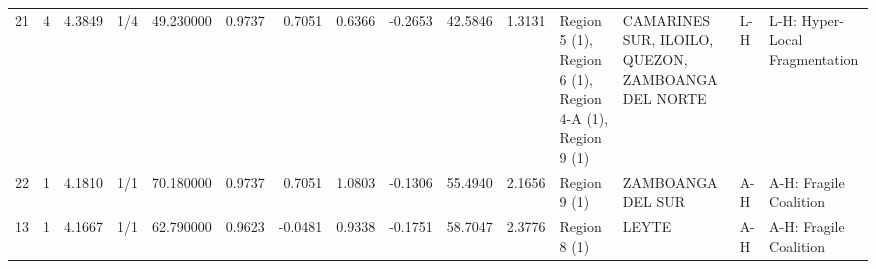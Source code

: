 \begin{tabular}{rrrlrrrrrrrllll}
21 & 4 & {\cellcolor[HTML]{5E7DE7}} \color[HTML]{F1F1F1} 4.3849 & 1/4 & {\cellcolor[HTML]{6B8DF0}} \color[HTML]{F1F1F1} 49.230000 & 0.9737 & 0.7051 & 0.6366 & -0.2653 & 42.5846 & 1.3131 & Region 5 (1), Region 6 (1), Region 4-A (1), Region 9 (1) & CAMARINES SUR, ILOILO, QUEZON, ZAMBOANGA DEL NORTE & L-H & L-H: Hyper-Local Fragmentation \\
22 & 1 & {\cellcolor[HTML]{3C4EC2}} \color[HTML]{F1F1F1} 4.1810 & 1/1 & {\cellcolor[HTML]{B8122A}} \color[HTML]{F1F1F1} 70.180000 & 0.9737 & 0.7051 & 1.0803 & -0.1306 & 55.4940 & 2.1656 & Region 9 (1) & ZAMBOANGA DEL SUR & A-H & A-H: Fragile Coalition \\
13 & 1 & {\cellcolor[HTML]{3B4CC0}} \color[HTML]{F1F1F1} 4.1667 & 1/1 & {\cellcolor[HTML]{F7AF91}} \color[HTML]{000000} 62.790000 & 0.9623 & -0.0481 & 0.9338 & -0.1751 & 58.7047 & 2.3776 & Region 8 (1) & LEYTE & A-H & A-H: Fragile Coalition \\
\bottomrule
\end{tabular}
